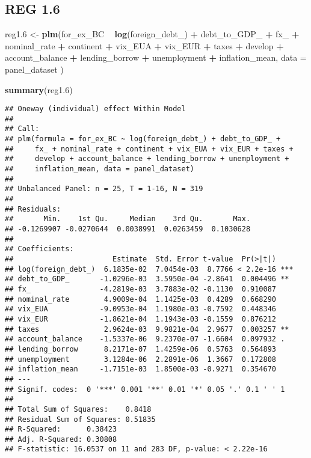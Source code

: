 \documentclass[]{article}
\newenvironment{Shaded}{\begin{snugshade}}{\end{snugshade}}
\newcommand{\KeywordTok}[1]{\textcolor[rgb]{0.13,0.29,0.53}{\textbf{#1}}}
\newcommand{\DataTypeTok}[1]{\textcolor[rgb]{0.13,0.29,0.53}{#1}}
\newcommand{\DecValTok}[1]{\textcolor[rgb]{0.00,0.00,0.81}{#1}}
\newcommand{\StringTok}[1]{\textcolor[rgb]{0.31,0.60,0.02}{#1}}
\newcommand{\OperatorTok}[1]{\textcolor[rgb]{0.81,0.36,0.00}{\textbf{#1}}}
\newcommand{\NormalTok}[1]{#1}
\begin{document}
\subsection{REG 1.6}\label{reg-1.6}

\begin{Shaded}
\begin{Highlighting}[]
\NormalTok{reg1.}\DecValTok{6}\NormalTok{ <-}\StringTok{ }\KeywordTok{plm}\NormalTok{(for_ex_BC }\OperatorTok{~}\StringTok{ }\KeywordTok{log}\NormalTok{(foreign_debt_) }\OperatorTok{+}\StringTok{ }\NormalTok{debt_to_GDP_ }\OperatorTok{+}\StringTok{ }\NormalTok{fx_ }\OperatorTok{+}\StringTok{ }\NormalTok{nominal_rate }\OperatorTok{+}\StringTok{ }\NormalTok{continent }\OperatorTok{+}\StringTok{ }\NormalTok{vix_EUA }\OperatorTok{+}\StringTok{ }\NormalTok{vix_EUR }\OperatorTok{+}\StringTok{ }\NormalTok{taxes }\OperatorTok{+}\StringTok{ }\NormalTok{develop }\OperatorTok{+}\StringTok{ }\NormalTok{account_balance }\OperatorTok{+}\StringTok{ }\NormalTok{lending_borrow }\OperatorTok{+}\StringTok{ }\NormalTok{unemployment }\OperatorTok{+}\StringTok{ }\NormalTok{inflation_mean, }\DataTypeTok{data =}\NormalTok{ panel_dataset )}

\KeywordTok{summary}\NormalTok{(reg1.}\DecValTok{6}\NormalTok{)}
\end{Highlighting}
\end{Shaded}

\begin{verbatim}
## Oneway (individual) effect Within Model
## 
## Call:
## plm(formula = for_ex_BC ~ log(foreign_debt_) + debt_to_GDP_ + 
##     fx_ + nominal_rate + continent + vix_EUA + vix_EUR + taxes + 
##     develop + account_balance + lending_borrow + unemployment + 
##     inflation_mean, data = panel_dataset)
## 
## Unbalanced Panel: n = 25, T = 1-16, N = 319
## 
## Residuals:
##       Min.    1st Qu.     Median    3rd Qu.       Max. 
## -0.1269907 -0.0270644  0.0038991  0.0263459  0.1030628 
## 
## Coefficients:
##                       Estimate  Std. Error t-value  Pr(>|t|)    
## log(foreign_debt_)  6.1835e-02  7.0454e-03  8.7766 < 2.2e-16 ***
## debt_to_GDP_       -1.0296e-03  3.5950e-04 -2.8641  0.004496 ** 
## fx_                -4.2819e-03  3.7883e-02 -0.1130  0.910087    
## nominal_rate        4.9009e-04  1.1425e-03  0.4289  0.668290    
## vix_EUA            -9.0953e-04  1.1980e-03 -0.7592  0.448346    
## vix_EUR            -1.8621e-04  1.1943e-03 -0.1559  0.876212    
## taxes               2.9624e-03  9.9821e-04  2.9677  0.003257 ** 
## account_balance    -1.5337e-06  9.2370e-07 -1.6604  0.097932 .  
## lending_borrow      8.2171e-07  1.4259e-06  0.5763  0.564893    
## unemployment        3.1284e-06  2.2891e-06  1.3667  0.172808    
## inflation_mean     -1.7151e-03  1.8500e-03 -0.9271  0.354670    
## ---
## Signif. codes:  0 '***' 0.001 '**' 0.01 '*' 0.05 '.' 0.1 ' ' 1
## 
## Total Sum of Squares:    0.8418
## Residual Sum of Squares: 0.51835
## R-Squared:      0.38423
## Adj. R-Squared: 0.30808
## F-statistic: 16.0537 on 11 and 283 DF, p-value: < 2.22e-16
\end{verbatim}
\end{document}
